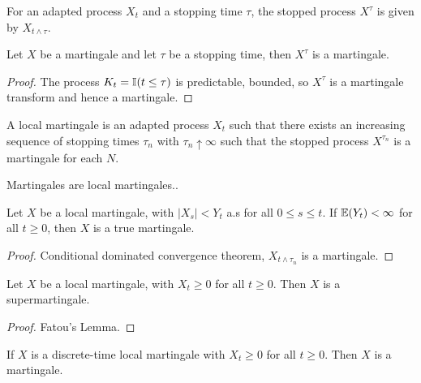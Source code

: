 \begin{defn}
  \label{sec:arbitrage-theory-9}
  For an adapted process $X_{t}$ and a stopping time $\tau$, the
  stopped process $X^{\tau}$ is given by $X_{t \wedge \tau}$.
\end{defn}

\begin{thm}
  \label{sec:arbitrage-theory-10}
  Let $X$ be a martingale and let $\tau$ be a stopping time, then
  $X^{\tau}$ is a martingale.
\end{thm}

\begin{proof}
  The process $K_{t} = \I{t \leq \tau}$  is predictable, bounded, so
  $X^{\tau}$ is a martingale transform and hence a martingale.
\end{proof}

\begin{defn}
  \label{sec:arbitrage-theory-11}
  A local martingale is an adapted process $X_{t}$ such that there
  exists an increasing sequence of stopping times $\tau_{n}$ with
  $\tau_{n} \uparrow \infty$ such that the stopped process
  $X^{\tau_{n}}$ is a martingale for each $N$.
\end{defn}

\begin{thm}
  \label{sec:arbitrage-theory-12}
  Martingales are local martingales..
\end{thm}

\begin{thm}
  \label{sec:arbitrage-theory-13}
  Let $X$ be a local martingale, with $|X_{s}| < Y_{t}$ a.s for all $0
  \leq s \leq t$.  If $\E{Y_{t}} < \infty$ for all $t \geq 0$, then
  $X$ is a true martingale.
\end{thm}

\begin{proof}
  Conditional dominated convergence theorem, $X_{t \wedge \tau_{n}}$
  is a martingale.
\end{proof}

\begin{thm}
  \label{sec:arbitrage-theory-15}
  Let $X$ be a local martingale, with $X_{t} \geq 0$ for all $t \geq
  0$.  Then $X$ is a supermartingale.
\end{thm}

\begin{proof}
  Fatou's Lemma.
\end{proof}

\begin{thm}
  \label{sec:arbitrage-theory-16}
  If $X$ is a discrete-time local martingale with $X_{t} \geq 0$ for
  all $t \geq 0$. Then $X$ is a martingale.
\end{thm}

